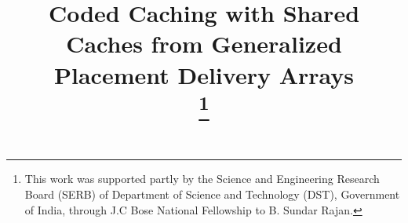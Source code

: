 \documentclass[conference,a4paper,10pt]{IEEEtran}
\begin{document}
\title{Coded Caching with Shared Caches from Generalized Placement Delivery Arrays\\

\thanks{This work was supported partly by the Science and Engineering Research Board (SERB) of Department of Science and Technology (DST), Government of India, through J.C Bose National Fellowship to B. Sundar Rajan.
}
}

\author{
}


\begin{comment}
\author{Elizabath Peter and B. Sundar Rajan \\
	Department of Electrical Communication Engineering, IISc Bangalore, India \\
	E-mail: \{elizabathp, bsrajan\}@iisc.ac.in \vspace{-3mm}
}
\end{comment}

\begin{comment}
\author{\IEEEauthorblockN{Elizabath Peter and B. Sundar Rajan}
\IEEEauthorblockA{\textit{Department of Electrical communication Engineering} \\
\textit{Indian Institute of Science}\\
Bangalore, India \\
\{elizabathp,bsrajan\}@iisc.ac.in
}
}
\end{comment}

\maketitle
\end{document}
